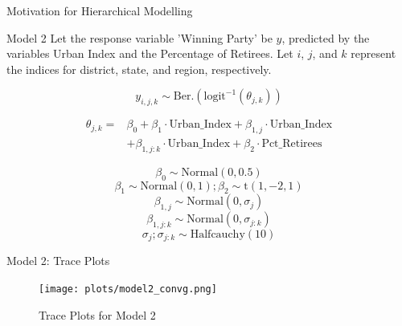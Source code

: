 \documentclass{beamer}
\begin{document}
\begin{frame}{Motivation for Hierarchical Modelling}
\begin{frame}{Model 2}
    Let the response variable 'Winning Party' be \(y\), predicted by the variables Urban Index and the Percentage of Retirees. Let \(i\), \(j\), and \(k\) represent the indices for district, state, and region, respectively.

    \[
    y_{i,j,k} \sim \text{Ber.}\left(\text{logit}^{-1}(\theta_{j,k})\right)
    \]

\[
\begin{aligned}
\theta_{j,k} =    &\beta_0 + \beta_1 \cdot \text{Urban\_Index} + \beta_{1,j} \cdot \text{Urban\_Index} \\
    &+ \beta_{1,j:k} \cdot \text{Urban\_Index} + \beta_2 \cdot \text{Pct\_Retirees}
\end{aligned}
\]



    \[\beta_0 \sim \text{Normal}(0, 0.5)\]
    \[\beta_1 \sim \text{Normal}(0, 1); \beta_2 \sim \text{t}(1,-2,1)\]
    \[\beta_{1,j} \sim \text{Normal}(0, \sigma_j)\]
    \[\beta_{1,j:k} \sim \text{Normal}(0, \sigma_{j:k})\]
    \[ \sigma_j; \sigma_{j:k} \sim \text{Halfcauchy}(10)\]

    
\end{frame}

\begin{frame}{Model 2: Trace Plots}
    \begin{center}
        \begin{figure}
            \texttt{[image: plots/model2\_convg.png]}
            \caption{Trace Plots for Model 2}
        \end{figure}
    \end{center}
\end{frame}




\end{frame}
\end{document}
